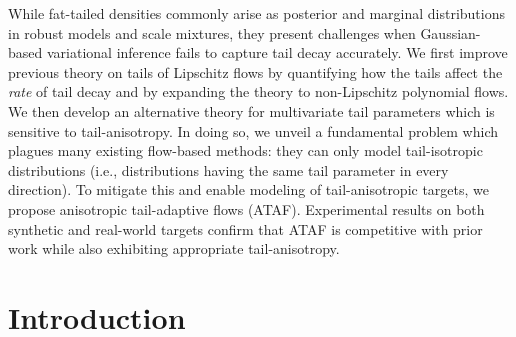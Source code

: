 \documentclass[thesis.tex]{subfiles}
\begin{document}


    While fat-tailed densities commonly arise as posterior and marginal distributions in
    robust models and scale mixtures, they present challenges when Gaussian-based 
    variational inference fails to capture tail decay accurately. 
    We first improve previous theory on tails of Lipschitz flows 
    by quantifying how the tails affect the \emph{rate} of tail decay 
    and by expanding the theory to non-Lipschitz polynomial flows.
    We then develop an alternative theory for multivariate tail parameters which is 
    sensitive to tail-anisotropy. 
    In doing so, we unveil a fundamental problem which plagues many existing flow-based 
    methods: they can only model tail-isotropic distributions (i.e., distributions 
    having the same tail parameter in every direction).
    To mitigate this and enable modeling of tail-anisotropic targets, we propose 
    anisotropic tail-adaptive flows (ATAF).
    Experimental results on both synthetic and real-world targets confirm that ATAF 
    is competitive with prior work while also exhibiting appropriate tail-anisotropy.

\section{Introduction}
\label{sec:intro}

\end{document}
